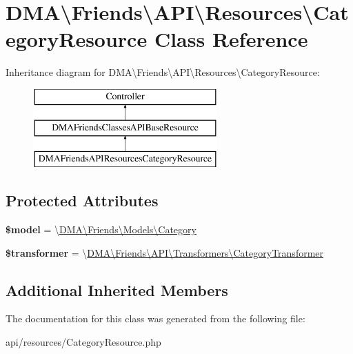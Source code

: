 \hypertarget{classDMA_1_1Friends_1_1API_1_1Resources_1_1CategoryResource}{}\section{D\+M\+A\textbackslash{}Friends\textbackslash{}A\+P\+I\textbackslash{}Resources\textbackslash{}Category\+Resource Class Reference}
\label{classDMA_1_1Friends_1_1API_1_1Resources_1_1CategoryResource}
Inheritance diagram for D\+M\+A\textbackslash{}Friends\textbackslash{}A\+P\+I\textbackslash{}Resources\textbackslash{}Category\+Resource\+:\begin{figure}[H]
\begin{center}
\leavevmode
\includegraphics[height=3.000000cm]{df/d7c/classDMA_1_1Friends_1_1API_1_1Resources_1_1CategoryResource}
\end{center}
\end{figure}
\subsection*{Protected Attributes}
\begin{DoxyCompactItemize}
\item 
\hypertarget{classDMA_1_1Friends_1_1API_1_1Resources_1_1CategoryResource_ae47e301f29fabd8970740d289e64a403}{}{\bfseries \$model} = \textquotesingle{}\textbackslash{}\hyperlink{classDMA_1_1Friends_1_1Models_1_1Category}{D\+M\+A\textbackslash{}\+Friends\textbackslash{}\+Models\textbackslash{}\+Category}\textquotesingle{}\label{classDMA_1_1Friends_1_1API_1_1Resources_1_1CategoryResource_ae47e301f29fabd8970740d289e64a403}

\item 
\hypertarget{classDMA_1_1Friends_1_1API_1_1Resources_1_1CategoryResource_a186aa77f0c9227536edae8186bbba598}{}{\bfseries \$transformer} = \textquotesingle{}\textbackslash{}\hyperlink{classDMA_1_1Friends_1_1API_1_1Transformers_1_1CategoryTransformer}{D\+M\+A\textbackslash{}\+Friends\textbackslash{}\+A\+P\+I\textbackslash{}\+Transformers\textbackslash{}\+Category\+Transformer}\textquotesingle{}\label{classDMA_1_1Friends_1_1API_1_1Resources_1_1CategoryResource_a186aa77f0c9227536edae8186bbba598}

\end{DoxyCompactItemize}
\subsection*{Additional Inherited Members}


The documentation for this class was generated from the following file\+:\begin{DoxyCompactItemize}
\item 
api/resources/Category\+Resource.\+php\end{DoxyCompactItemize}
